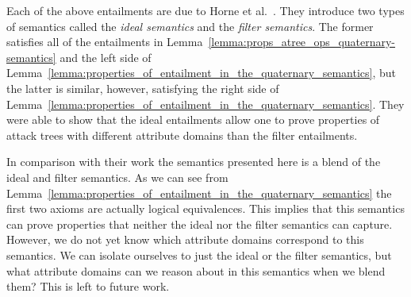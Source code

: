 Each of the above entailments are due to Horne et
al.~\cite{horne2017semantics}.  They introduce two types of semantics
called the \emph{ideal semantics} and the \emph{filter semantics}.
The former satisfies all of the entailments in
Lemma~\ref{lemma:props_atree_ops_quaternary-semantics} and the left
side of
Lemma~\ref{lemma:properties_of_entailment_in_the_quaternary_semantics},
but the latter is similar, however, satisfying the right side of
Lemma~\ref{lemma:properties_of_entailment_in_the_quaternary_semantics}.
They were able to show that the ideal entailments allow one to prove
properties of attack trees with different attribute domains than the
filter entailments.

In comparison with their work the semantics presented here is a blend
of the ideal and filter semantics. As we can see from
Lemma~\ref{lemma:properties_of_entailment_in_the_quaternary_semantics}
the first two axioms are actually logical equivalences. This implies
that this semantics can prove properties that neither the ideal nor
the filter semantics can capture.  However, we do not yet know which
attribute domains correspond to this semantics.  We can isolate
ourselves to just the ideal or the filter semantics, but what
attribute domains can we reason about in this semantics when we blend
them?  This is left to future work.

